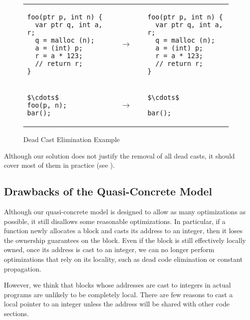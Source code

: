 \begin{figure}[t]
\center
\begin{tabular}{@{}l@{}l@{~~}l}
\begin{lstlisting}
foo(ptr p, int n) {
  var ptr q, int a, r;
  q = malloc (n);
  a = (int) p;
  r = a * 123;
  // return r;
}
\end{lstlisting}
&
$\quad\rightarrow\quad$
&
\begin{lstlisting}
foo(ptr p, int n) {
  var ptr q, int a, r;
  q = malloc (n);
  a = (int) p;
  r = a * 123;
  // return r;
}
\end{lstlisting}
\\
\begin{lstlisting}
$\cdots$
foo(p, n);
bar();
\end{lstlisting}
&
$\quad\rightarrow\quad$
&
\begin{lstlisting}
$\cdots$

bar();
\end{lstlisting}
\end{tabular}
\caption{Dead Cast Elimination Example}
\label{code:deadcast}
\end{figure}

Although our solution does not justify the removal of all dead casts,
it should cover most of them in practice (see ).



\subsection{Drawbacks of the Quasi-Concrete Model}
\label{idea:downside}

Although our quasi-concrete model is designed to allow as many optimizations as possible, it still disallows some reasonable optimizations. 
In particular, if a function newly allocates a block and casts its address to an
integer, then it loses the ownership guarantees on the block. 
Even if the block is still effectively locally owned, 
once its address is cast to an integer, we can no longer perform optimizations that rely on its locality, such as dead code elimination or constant propagation. 

However, we think that blocks whose addresses are cast to
integers in actual programs are unlikely to be completely local. There are few reasons to cast a local pointer to an integer unless the address will be shared with other code sections. 

